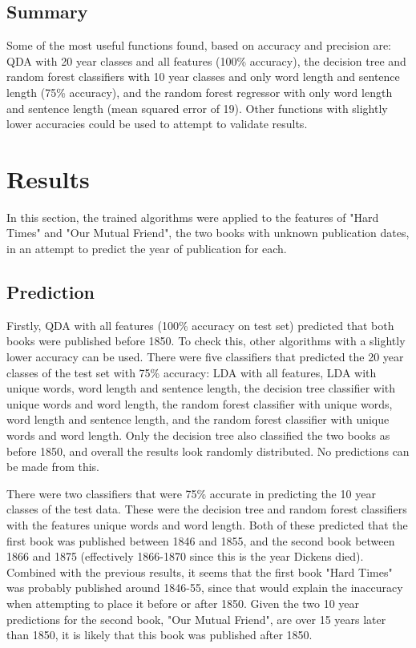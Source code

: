 \documentclass[11pt,a4paper,reqno]{amsart}
\begin{document}
\subsection{Summary}
Some of the most useful functions found, based on accuracy and precision are: QDA with 20 year classes and all features (100\% accuracy), the decision tree and random forest classifiers with 10 year classes and only word length and sentence length (75\% accuracy), and the random forest regressor with only word length and sentence length (mean squared error of 19). Other functions with slightly lower accuracies could be used to attempt to validate results.

\section{Results}%
In this section, the trained algorithms were applied to the features of "Hard Times" and "Our Mutual Friend", the two books with unknown publication dates, in an attempt to predict the year of publication for each. 

\subsection{Prediction}
Firstly, QDA with all features (100\% accuracy on test set) predicted that both books were published before 1850. To check this, other algorithms with a slightly lower accuracy can be used. There were five classifiers that predicted the 20 year classes of the test set with 75\% accuracy: LDA with all features, LDA with unique words, word length and sentence length, the decision tree classifier with unique words and word length, the random forest classifier with unique words, word length and sentence length, and the random forest classifier with unique words and word length. Only the decision tree also classified the two books as before 1850, and overall the results look randomly distributed. No predictions can be made from this.



There were two classifiers that were 75\% accurate in predicting the 10 year classes of the test data. These were the decision tree and random forest classifiers with the features unique words and word length. Both of these predicted that the first book was published between 1846 and 1855, and the second book between 1866 and 1875 (effectively 1866-1870 since this is the year Dickens died). Combined with the previous results, it seems that the first book "Hard Times" was probably published around 1846-55, since that would explain the inaccuracy when attempting to place it before or after 1850. Given the two 10 year predictions for the second book, "Our Mutual Friend", are over 15 years later than 1850, it is likely that this book was published after 1850.
\end{document}
